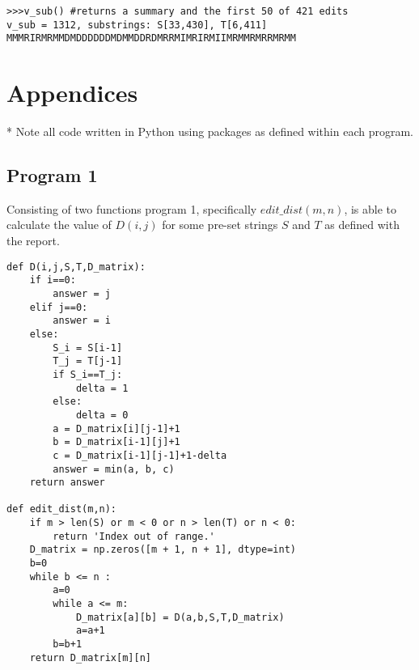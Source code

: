 \documentclass{article}
\begin{document}
\begin{lstlisting}
>>>v_sub() #returns a summary and the first 50 of 421 edits
v_sub = 1312, substrings: S[33,430], T[6,411]
MMMRIRMRMMDMDDDDDDMDMMDDRDMRRMIMRIRMIIMRMMRMRRMRMM 
\end{lstlisting}

\newpage

\section{Appendices}
* Note all code written in Python using packages as defined within each program.
\vspace{-0.5cm}
\subsection{Program 1}
\vspace{-0.3cm}
\label{subsec:Program 1}
Consisting of two functions program 1, specifically $edit\_dist(m,n)$, is able to calculate the value of $D(i,j)$ for some pre-set strings $S$ and $T$ as defined with the report. 
\begin{lstlisting}
def D(i,j,S,T,D_matrix):
    if i==0:
        answer = j
    elif j==0:
        answer = i
    else:
        S_i = S[i-1]
        T_j = T[j-1]
        if S_i==T_j:
            delta = 1
        else:
            delta = 0
        a = D_matrix[i][j-1]+1
        b = D_matrix[i-1][j]+1
        c = D_matrix[i-1][j-1]+1-delta
        answer = min(a, b, c)
    return answer

def edit_dist(m,n):
    if m > len(S) or m < 0 or n > len(T) or n < 0:
        return 'Index out of range.'
    D_matrix = np.zeros([m + 1, n + 1], dtype=int)
    b=0
    while b <= n :
        a=0
        while a <= m:
            D_matrix[a][b] = D(a,b,S,T,D_matrix)
            a=a+1
        b=b+1
    return D_matrix[m][n]
\end{lstlisting}
\vspace{-0.5cm}
\end{document}
